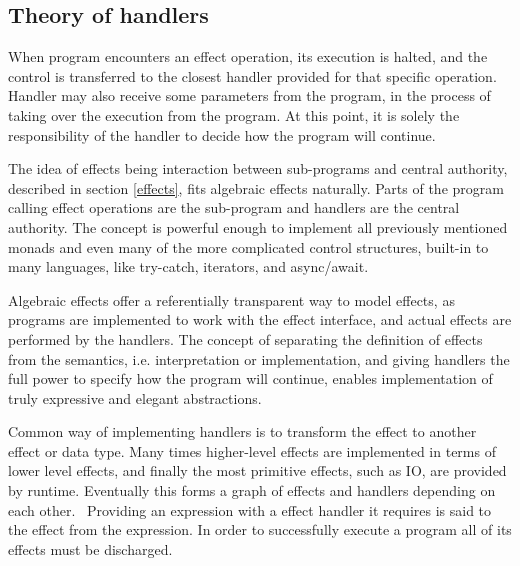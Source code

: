 \subsection{Theory of handlers}
When program encounters an effect operation, its execution is halted, and the control is transferred to the closest handler provided for that specific operation. Handler may also receive some parameters from the program, in the process of taking over the execution from the program. At this point, it is solely the responsibility of the handler to decide how the program will continue.

The idea of effects being interaction between sub-programs and central authority, described in section \ref{effects}, fits algebraic effects naturally. Parts of the program calling effect operations are the sub-program and handlers are the central authority. The concept is powerful enough to implement all previously mentioned monads and even many of the more complicated control structures, built-in to many languages, like try-catch, iterators, and async/await.~\cite{alg-effs-for-fp} 

Algebraic effects offer a referentially transparent way to model effects, as programs are implemented to work with the effect interface, and actual effects are performed by the handlers. The concept of separating the definition of effects from the semantics, i.e. interpretation or implementation, and giving handlers the full power to specify how the program will continue, enables implementation of truly expressive and elegant abstractions.

Common way of implementing handlers is to transform the effect to another effect or data type. Many times higher-level effects are implemented in terms of lower level effects, and finally the most primitive effects, such as IO, are provided by runtime. Eventually this forms a graph of effects and handlers depending on each other.~\cite{intro-to-alg-eff} Providing an expression with a effect handler it requires is said to  the effect from the expression. In order to successfully execute a program all of its effects must be discharged.

